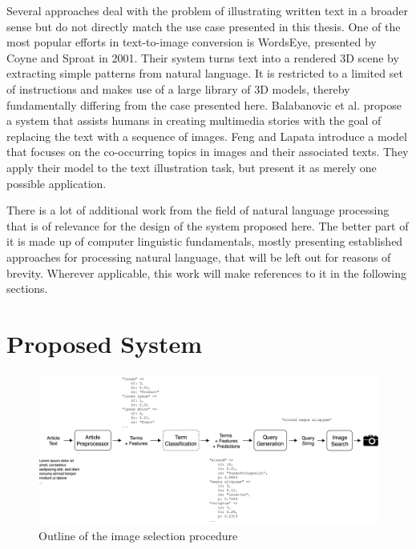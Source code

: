\documentclass[11pt,a4paper,twoside]{article}
\begin{document}
Several approaches deal with the problem of illustrating written text in a broader sense but do not directly match the use case presented in this thesis. One of the most popular efforts in text-to-image conversion is WordsEye, presented by Coyne and Sproat in 2001. \cite{Coyne2001WordsEye:System} Their system turns text into a rendered 3D scene by extracting simple patterns from natural language. It is restricted to a limited set of instructions and makes use of a large library of 3D models, thereby fundamentally differing from the case presented here. Balabanovic et al. propose a system that assists humans in creating multimedia stories with the goal of replacing the text with a sequence of images. \cite{Balabanovic2000StorytellingPhotographs} Feng and Lapata introduce a model that focuses on the co-occurring topics in images and their associated texts. They apply their model to the text illustration task, but present it as merely one possible application. \cite{Feng2010TopicIllustration}

\bigskip

There is a lot of additional work from the field of natural language processing that is of relevance for the design of the system proposed here. The better part of it is made up of computer linguistic fundamentals, mostly presenting established approaches for processing natural language, that will be left out for reasons of brevity. Wherever applicable, this work will make references to it in the following sections.


\cleardoublepage

\section{Proposed System} \label{System}

\begin{figure}[h]
  \includegraphics[width=\columnwidth]{picpic-overview.png}
  \caption{Outline of the image selection procedure}
  \label{fig:picpic-overview}
\end{figure}
\end{document}
